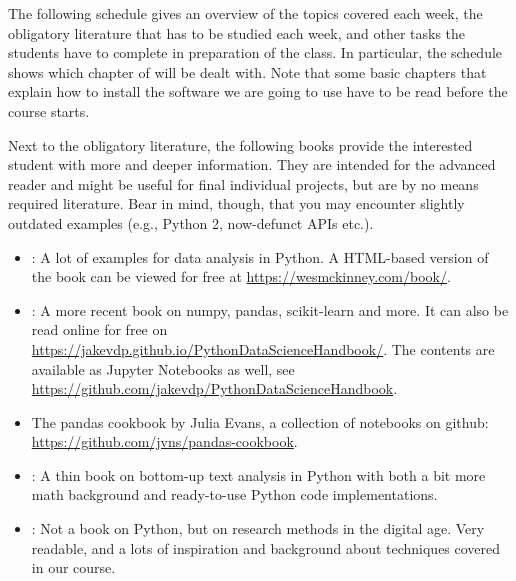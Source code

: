 
The following schedule gives an overview of the topics covered each week, the obligatory literature that has to be studied each week, and other tasks the students have to complete in preparation of the class.
In particular, the schedule shows which chapter of \cite{cssbook} will be dealt with. Note that some basic chapters that explain how to install the software we are going to use have to be read before the course starts.

Next to the obligatory literature, the following books provide the interested student with more and deeper information. They are intended for the advanced reader and might be useful for final individual projects, but are by no means required literature. Bear in mind, though, that you may encounter slightly outdated examples (e.g., Python 2, now-defunct APIs etc.).

\begin{itemize}
\item \citealp{McKinney2012}: A lot of examples for data analysis in Python. A HTML-based version of the book can be viewed for free at \url{https://wesmckinney.com/book/}.
\item \citealp{VanderPlas2016}: A more recent book on numpy, pandas, scikit-learn and more. It can also be read online for free on \url{https://jakevdp.github.io/PythonDataScienceHandbook/}. The contents are available as Jupyter Notebooks as well, see \url{https://github.com/jakevdp/PythonDataScienceHandbook}.
\item The pandas cookbook by Julia Evans, a collection of notebooks on github: \url{https://github.com/jvns/pandas-cookbook}.
\item \citealp{Hovy2020}: A thin book on bottom-up text analysis in Python with both a bit more math background and ready-to-use Python code implementations.
\item \citealp{Salganik2017}: Not a book on Python, but on research methods in the digital age. Very readable, and a lots of inspiration and background about techniques covered in our course.
\end{itemize}
